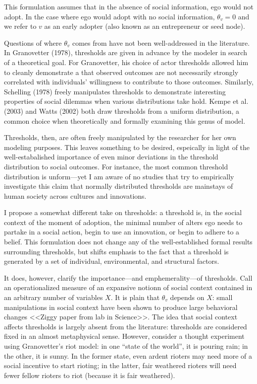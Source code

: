 \documentclass{article}
\begin{document}
This formulation assumes that in the absence of social information, ego would not adopt. In the case where ego would adopt with no social information, $\theta_v = 0$ and we refer to $v$ as an early adopter (also known as an entrepreneur or seed node).

Questions of where $\theta_v$ comes from have not been well-addressed in the literature. In Granovetter (1978), thresholds are given in advance by the modeler in search of a theoretical goal. For Granovetter, his choice of actor thresholds allowed him to cleanly demonstrate a that observed outcomes are not necessarily strongly correlated with individuals' willingness to contribute to those outcomes. Similarly, Schelling (1978) freely manipulates thresholds to demonstrate interesting properties of social dilemmas when various distributions take hold. Kempe et al. (2003) and Watts (2002) both draw thresholds from a uniform distribution, a common choice when theoretically and formally examining this genus of model.

Thresholds, then, are often freely manipulated by the researcher for her own modeling purposes. This leaves something to be desired, espeically in light of the well-estabalished importance of even minor deviations in the threshold distribution to social outcomes. For instance, the most common threshold distribution is unform---yet I am aware of no studies that try to empirically investigate this claim that normally distributed thresholds are mainstays of human society across cultures and innovations.

I propose a somewhat different take on thresholds: a threshold is, in the social context of the moment of adoption, the minimal number of alters ego needs to partake in a social action, begin to use an innovation, or begin to adhere to a belief. This formulation does not change any of the well-established formal results surrounding thresholds, but shifts emphasis to the fact that a threshold is generated by a set of individual, environmental, and structural factors. 

It does, however, clarify the importance---and emphemerality---of thresholds. Call an operationalized measure of an expansive notionn of social context contained in an arbitrary number of variables $X$. It is plain that $\theta_v$ depends on $X$: small manipulations in social context have been shown to produce large behavioral changes <<Ziggy paper from lab in Science>>. The idea that social context affects thresholds is largely absent from the literature: thresholds are considered fixed in an almost metaphysical sense. However, consider a thought experiment using Granovetter's riot model: in one ``state of the world'', it is pouring rain; in the other, it is sunny. In the former state, even ardent rioters may need more of a social incentive to start rioting; in the latter, fair weathered rioters will need fewer fellow rioters to riot (because it is fair weathered).
\end{document}
